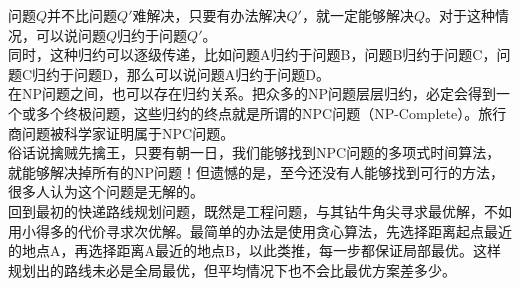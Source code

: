 问题$ Q $并不比问题$ Q' $难解决，只要有办法解决$ Q' $，就一定能够解决$ Q $。对于这种情况，可以说问题$ Q $归约于问题$ Q' $。\\

同时，这种归约可以逐级传递，比如问题A归约于问题B，问题B归约于问题C，问题C归约于问题D，那么可以说问题A归约于问题D。\\

在NP问题之间，也可以存在归约关系。把众多的NP问题层层归约，必定会得到一个或多个终极问题，这些归约的终点就是所谓的NPC问题（NP-Complete）。旅行商问题被科学家证明属于NPC问题。\\

俗话说擒贼先擒王，只要有朝一日，我们能够找到NPC问题的多项式时间算法，就能够解决掉所有的NP问题！但遗憾的是，至今还没有人能够找到可行的方法，很多人认为这个问题是无解的。\\

回到最初的快递路线规划问题，既然是工程问题，与其钻牛角尖寻求最优解，不如用小得多的代价寻求次优解。最简单的办法是使用贪心算法，先选择距离起点最近的地点A，再选择距离A最近的地点B，以此类推，每一步都保证局部最优。这样规划出的路线未必是全局最优，但平均情况下也不会比最优方案差多少。

\newpage